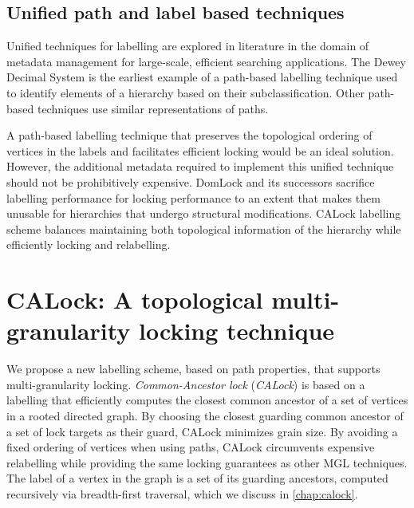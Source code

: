 \subsection{Unified path and label based techniques}
Unified techniques for labelling are explored in literature in the domain of metadata management for large-scale, efficient searching applications. The Dewey Decimal System \cite{DBLP:journals/jd/Sweeney83} is the earliest example of a path-based labelling technique used to identify elements of a hierarchy based on their subclassification. Other path-based techniques use similar representations of paths. 

A path-based labelling technique that preserves the topological ordering of vertices in the labels and facilitates efficient locking would be an ideal solution. However, the additional metadata required to implement this unified technique should not be prohibitively expensive. DomLock and its successors sacrifice labelling performance for locking performance to an extent that makes them unusable for hierarchies that undergo structural modifications. CALock labelling scheme balances maintaining both topological information of the hierarchy while efficiently locking and relabelling. 

\section{CALock: A topological multi-granularity locking technique}

We propose a new labelling scheme, based on path properties, that supports multi-granularity locking. {\em Common-Ancestor lock} ({\em CALock}) is based on a labelling that efficiently computes the closest common ancestor of a set of vertices in a rooted directed graph.
By choosing the closest guarding common ancestor of a set of lock targets as their guard, CALock minimizes grain size. By avoiding a fixed ordering of vertices when using paths, CALock circumvents expensive relabelling while providing the same locking guarantees as other MGL techniques. The label of a vertex in the graph is a set of its guarding ancestors, computed recursively via breadth-first traversal, which we discuss in \cref{chap:calock}.
